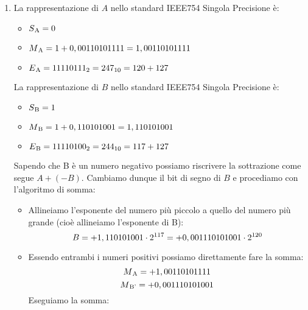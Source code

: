 \documentclass{article}
\begin{document}
\begin{enumerate}
    \item La rappresentazione di $A$ nello standard IEEE754 Singola Precisione è:
    \begin{itemize}
        \item[] $S\textsubscript{A}=0$
        \item[] $M\textsubscript{A}=1+0,00110101111=1,00110101111$
        \item[] $E\textsubscript{A}=11110111\textsubscript{2}=247\textsubscript{10}=120+127$
    \end{itemize}
    La rappresentazione di $B$ nello standard IEEE754 Singola Precisione è:
    \begin{itemize}
        \item[] $S\textsubscript{B}=1$
        \item[] $M\textsubscript{B}=1+0,110101001=1,110101001$
        \item[] $E\textsubscript{B}=11110100\textsubscript{2}=244\textsubscript{10}=117+127$
    \end{itemize}
    Sapendo che B \`e un numero negativo possiamo riscrivere la sottrazione come segue $A +(-B)$. Cambiamo dunque il bit di segno di $B$ e procediamo con l'algoritmo di somma:
    \begin{itemize}
        \item Allineiamo l'esponente del numero pi\`u piccolo a quello del numero pi\`u grande (cio\`e allineiamo l'esponente di B):
$$B=+1,110101001\cdot2\textsuperscript{117}=+0,001110101001\cdot2\textsuperscript{120}$$
        \item Essendo entrambi i numeri positivi possiamo direttamente fare la somma:
$$M\textsubscript{A}=+1,00110101111$$
$$M\textsubscript{B'}=+0,001110101001$$
       Eseguiamo la somma:
        \begin{center}
\end{center}
\end{itemize}
\end{enumerate}
\end{document}
